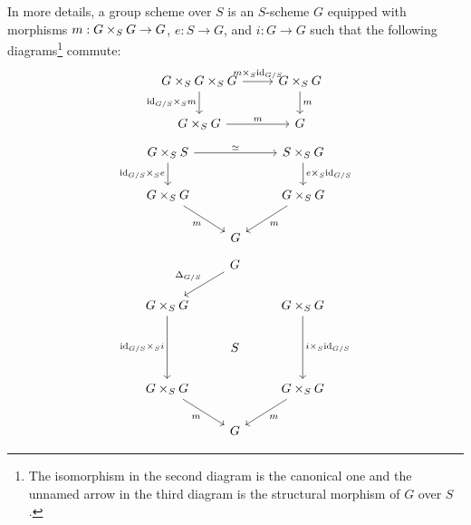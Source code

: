 \begin{definition}
                    In more details, a group scheme over $S$ is an $S$-scheme $G$ equipped with morphisms $m: G \x_S G \to G$, $e: S \to G$, and $i: G \to G$ such that the following diagrams\footnote{The isomorphism in the second diagram is the canonical one and the unnamed arrow in the third diagram is the structural morphism of $G$ over $S$.} commute:
                        $$
                            \begin{tikzcd}
                            	{G \x_S G \x_S G} & {G \x_S G} \\
                            	{G \x_S G} & G
                            	\arrow["{\id_{G/S} \x_S m}"', from=1-1, to=2-1]
                            	\arrow["m", from=2-1, to=2-2]
                            	\arrow["{m \x_S \id_{G/S}}", from=1-1, to=1-2]
                            	\arrow["m", from=1-2, to=2-2]
                            \end{tikzcd}
                        $$
                        $$
                            \begin{tikzcd}
                            	{G \x_S S} && {S \x_S G} \\
                            	{G \x_S G} && {G \x_S G} \\
                            	& G
                            	\arrow["m"', from=2-1, to=3-2]
                            	\arrow["{e \x_S \id_{G/S}}", from=1-3, to=2-3]
                            	\arrow["m", from=2-3, to=3-2]
                            	\arrow["{\id_{G/S} \x_S e}"', from=1-1, to=2-1]
                            	\arrow["\cong", from=1-1, to=1-3]
                            \end{tikzcd}
                        $$
                        $$
                            \begin{tikzcd}
                            	& G \\
                            	{G \x_S G} && {G \x_S G} \\
                            	& S \\
                            	{G \x_S G} && {G \x_S G} \\
                            	& G
                            	\arrow["m", from=4-3, to=5-2]
                            	\arrow["m"', from=4-1, to=5-2]
                            	\arrow["{\id_{G/S} \x_S i}"', from=2-1, to=4-1]
                            	\arrow["{i \x_S \id_{G/S}}", from=2-3, to=4-3]
                            	\arrow["{\Delta_{G/S}}"', from=1-2, to=2-1]

\end{tikzcd}$$
\end{definition}

